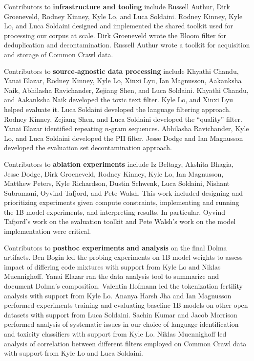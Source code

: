 \documentclass{article}
\begin{document}
Contributors to \textbf{infrastructure and tooling} include Russell Authur, Dirk Groeneveld, Rodney Kinney, Kyle Lo, and Luca Soldaini. Rodney Kinney, Kyle Lo, and Luca Soldaini designed and implemented the shared toolkit used for processing our corpus at scale. Dirk Groeneveld wrote the Bloom filter for deduplication and decontamination. Russell Authur wrote a toolkit for acquisition and storage of Common Crawl data.

Contributors to \textbf{source-agnostic data processing} include Khyathi Chandu, Yanai Elazar, Rodney Kinney, Kyle Lo, Xinxi Lyu, Ian Magnusson, Aakanksha Naik, Abhilasha Ravichander, Zejiang Shen, and Luca Soldaini. Khyathi Chandu, and Aakanksha Naik developed the toxic text filter. Kyle Lo, and Xinxi Lyu helped evaluate it. Luca Soldaini developed the language filtering approach. Rodney Kinney, Zejiang Shen, and Luca Soldaini developed the ``quality'' filter. Yanai Elazar identified repeating $n$-gram sequences. Abhilasha Ravichander, Kyle Lo, and Luca Soldaini developed the PII filter. Jesse Dodge and Ian Magnusson developed the evaluation set decontamination approach. 

Contributors to \textbf{ablation experiments} include Iz Beltagy, Akshita Bhagia, Jesse Dodge, Dirk Groeneveld, Rodney Kinney, Kyle Lo, Ian Magnusson, Matthew Peters, Kyle Richardson, Dustin Schwenk, Luca Soldaini, Nishant Subramani, Oyvind Tafjord, and Pete Walsh. This work included designing and prioritizing experiments given compute constraints, implementing and running the 1B model experiments, and interpreting results. In particular, Oyvind Tafjord's work on the evaluation toolkit and Pete Walsh's work on the model implementation were critical.

Contributors to \textbf{posthoc experiments and analysis} on the final Dolma artifacts. Ben Bogin led the probing experiments on 1B model weights to assess impact of differing code mixtures with support from Kyle Lo and Niklas Muennighoff. Yanai Elazar ran the data analysis tool to summarize and document Dolma's composition. Valentin Hofmann led the tokenization fertility analysis with support from Kyle Lo. 
Ananya Harsh Jha and Ian Magnusson performed experiments training and evaluating baseline 1B models on other open datasets with support from Luca Soldaini.
Sachin Kumar and Jacob Morrison performed analysis of systematic issues in our choice of language identification and toxicity classifiers with support from Kyle Lo.
Niklas Muennighoff led analysis of correlation between different filters employed on Common Crawl data with support from Kyle Lo and Luca Soldaini.
\end{document}
